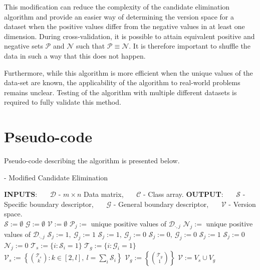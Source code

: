This modification can reduce the complexity of the candidate elimination algorithm and provide an easier way of determining the version space for a dataset when the positive values differ from the negative values in at least one dimension.  During cross-validation, it is possible to attain equivalent positive and negative sets $\mathcal{P}$ and $\mathcal{N}$ such that $\mathcal{P} \equiv \mathcal{N}$.  It is therefore important to shuffle the data in such a way that this does not happen.

Furthermore, while this algorithm is more efficient when the unique values of the data-set are known, the applicability of the algorithm to real-world problems remains unclear.  Testing of the algorithm with multiple different datasets is required to fully validate this method.

\newpage

\section{Pseudo-code}

Pseudo-code describing the algorithm is presented below.
 
\begin{Algorithm}[H]{12cm}
  \caption{ - Modified Candidate Elimination}
  \begin{algorithmic} 
    \State \textbf{INPUTS}: 
    \State \ \ \ $\mathcal{D}$ - $m \times n$ Data matrix,
    \State \ \ \ $\mathcal{C}$ - Class array.
    \State \textbf{OUTPUT}: 
    \State \ \ \ $\mathcal{S}$ - Specific boundary descriptor,
    \State \ \ \ $\mathcal{G}$ - General boundary descriptor, 
    \State \ \ \ $\mathcal{V}$ - Version space.
    \\
    \hrulefill
      \State $\mathcal{S} := \emptyset$
      \State $\mathcal{G} := \emptyset$
      \State $\mathcal{V} := \emptyset$
        \State $\mathcal{P}_j :=$ unique positive values of $\mathcal{D}_{\cdot,j}$
        \State $\mathcal{N}_j :=$ unique positive values of $\mathcal{D}_{\cdot,j}$
          \State $\mathcal{S}_j := 1,\ \mathcal{G}_j := 1$
          \State $\mathcal{S}_j := 1,\ \mathcal{G}_j := 0$
          \State $\mathcal{S}_j := 0,\ \mathcal{G}_j := 0$
            \State $\mathcal{S}_j := 1$
          \Else
            \State $\mathcal{S}_j := 0$
          \EndIf
          \State $\mathcal{N}_j := 0$
        \EndIf
      \EndFor
      \State $\mathcal{T}_s := \{i : \mathcal{S}_i = 1\}$
      \State $\mathcal{T}_g := \{i : \mathcal{G}_i = 1\}$
      \State $\mathcal{V}_s := \left\{\binom{\mathcal{T}_s}{k} : k \in [2,l],\ l = \sum_i \mathcal{S}_i \right\}$
      \State $\mathcal{V}_g := \left\{ \binom{\mathcal{T}_g}{1} \right\}$
      \State $\mathcal{V}   := V_s \cup V_g$
    \EndFunction
  \end{algorithmic}
\end{Algorithm}

